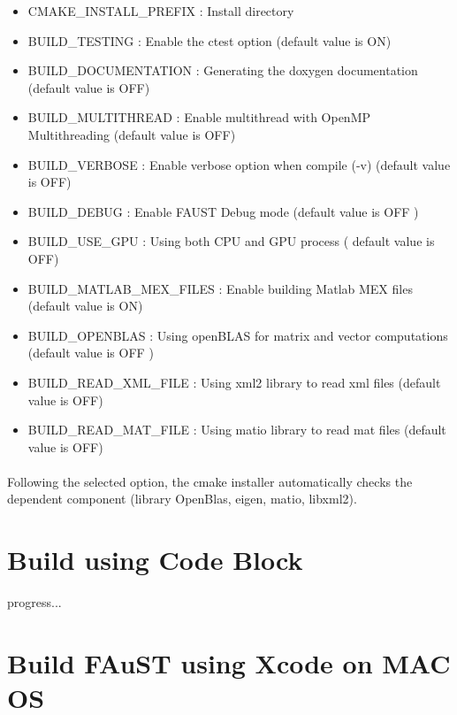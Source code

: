 \begin{itemize}
\item CMAKE\_INSTALL\_PREFIX : Install directory
\item BUILD\_TESTING : Enable the ctest option (default value is ON)
\item BUILD\_DOCUMENTATION : Generating the doxygen documentation (default value is OFF)  
\item BUILD\_MULTITHREAD : Enable multithread with OpenMP Multithreading (default value is OFF)
\item BUILD\_VERBOSE : Enable verbose option when compile (-v) (default value is OFF)
\item BUILD\_DEBUG : Enable FAUST Debug mode (default value is OFF )
\item BUILD\_USE\_GPU : Using both CPU and GPU process ( default value is OFF)
\item BUILD\_MATLAB\_MEX\_FILES : Enable building Matlab MEX files (default value is ON)
\item BUILD\_OPENBLAS : Using openBLAS for matrix and vector computations (default value is OFF )
\item BUILD\_READ\_XML\_FILE : Using xml2 library to read xml files (default value is OFF)
\item BUILD\_READ\_MAT\_FILE : Using matio library to read mat files (default value is OFF)
\end{itemize}

\paragraph{}Following the selected option, the cmake installer automatically checks the dependent component (library OpenBlas, eigen, matio, libxml2).  

\section{Build using Code Block}\label{sec:UnixInstallCodeBlock}
progress...

\section{Build FAuST using Xcode on MAC OS}\label{sec:MacInstallXcode}

